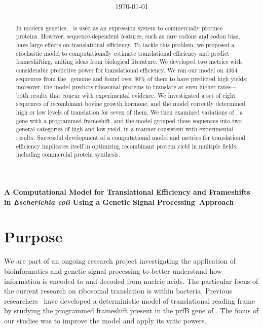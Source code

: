 \documentclass[12pt]{article}
\author{\sc{\BWFauthors}}
\date{{\sc \today}}
\title{\bf{\BWFtitle{\emph}}}
\newcommand{\BWFtitle}[2]{A Computational Model for Translational
  Efficiency and Frameshifts in #1{Escherichia coli} Using a Genetic Signal
  Processing#2Approach}
\begin{document}
\begin{singlespace}
  \tableofcontents
\end{singlespace}

\clearpage
\begin{Large}
\noindent\textbf{\BWFtitle{\emph}{~}}
\end{Large}
\begin{abstract}\begin{normalsize}
In modern genetics, \ecoli\ is used as an expression system to commercially 
produce proteins.  However, sequence-dependent features, such as rare codons 
and codon bias, have large effects on translational efficiency.  To tackle 
this problem, we proposed a stochastic model to computationally estimate 
translational efficiency and predict frameshifting, uniting ideas from biological 
literature. We developed two metrics with considerable predictive power 
for translational efficiency. We ran our model on 4364 sequences from the 
\ecoli\ genome and found over 90\% of them to have predicted high yields; 
moreover, the model predicts ribosomal proteins to translate at even higher rates---both 
results that concur with experimental evidence.  We investigated a set of eight 
sequences of recombinant bovine growth hormone, and the model correctly determined 
high or low levels of translation for seven of them.  We then examined variations of
\prfB, a gene with a programmed frameshift, and the model grouped these sequences 
into two general categories of high and low yield, in a manner consistent 
with experimental results.  Successful development of a computational model and 
metrics for translational efficiency implicates itself in optimizing 
recombinant protein yield in multiple fields, including commercial protein synthesis.
\end{normalsize}\end{abstract}  
  
\clearpage
{}

\section{Purpose}
We are part of an ongoing research project
investigating the application of bioinformatics
and genetic signal processing to better understand how
information is encoded to and decoded from nucleic acids.  The particular
focus of the current research on ribosomal translation is within
bacteria.  Previous researchers~\cite{lalit:mechanics}
have developed a deterministic model
of translational reading frame by studying the
programmed frameshift present in the prfB gene of \ecoli.  The focus
of our studies was to improve the model and apply its vatic powers.
\end{document}
